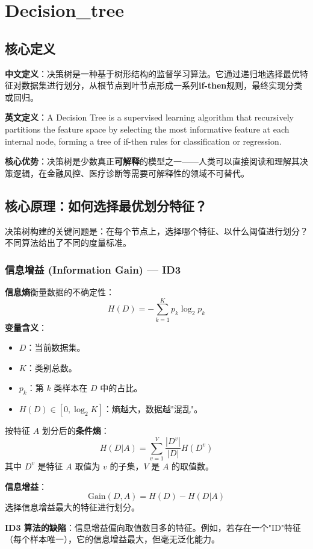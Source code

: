 \documentclass[12pt, a4paper]{book}
\begin{document}
\chapter{Decision\_tree}


\section{核心定义}
\textbf{中文定义}：决策树是一种基于树形结构的监督学习算法。它通过递归地选择最优特征对数据集进行划分，从根节点到叶节点形成一系列\textbf{if-then}规则，最终实现分类或回归。

\textbf{英文定义}：A Decision Tree is a supervised learning algorithm that recursively partitions the feature space by selecting the most informative feature at each internal node, forming a tree of if-then rules for classification or regression.

\textbf{核心优势}：决策树是少数真正\textbf{可解释}的模型之一——人类可以直接阅读和理解其决策逻辑，在金融风控、医疗诊断等需要可解释性的领域不可替代。

\section{核心原理：如何选择最优划分特征？}
决策树构建的关键问题是：在每个节点上，选择哪个特征、以什么阈值进行划分？不同算法给出了不同的度量标准。

\subsection{信息增益 (Information Gain) — ID3}
\textbf{信息熵}衡量数据的不确定性：
$$ H(D) = -\sum_{k=1}^K p_k \log_2 p_k $$
\textbf{变量含义}：
\begin{itemize}
    \item $D$：当前数据集。
    \item $K$：类别总数。
    \item $p_k$：第 $k$ 类样本在 $D$ 中的占比。
    \item $H(D) \in [0, \log_2 K]$：熵越大，数据越"混乱"。
\end{itemize}
按特征 $A$ 划分后的\textbf{条件熵}：
$$ H(D|A) = \sum_{v=1}^V \frac{|D^v|}{|D|} H(D^v) $$
其中 $D^v$ 是特征 $A$ 取值为 $v$ 的子集，$V$ 是 $A$ 的取值数。

\textbf{信息增益}：
$$ \text{Gain}(D, A) = H(D) - H(D|A) $$
选择信息增益最大的特征进行划分。

\textbf{ID3 算法的缺陷}：信息增益偏向取值数目多的特征。例如，若存在一个"ID"特征（每个样本唯一），它的信息增益最大，但毫无泛化能力。
\end{document}
